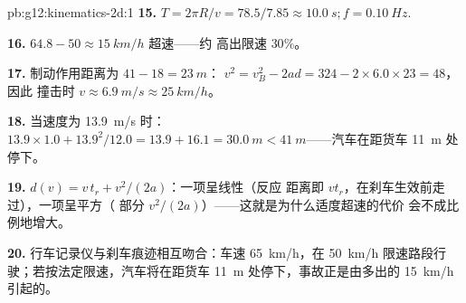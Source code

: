\begin{solution}{pb:g12:kinematics-2d:1}
\textbf{15.} $T = 2\pi R/v = 78.5/7.85 \approx \qty{10.0}{s};
f = \qty{0.10}{Hz}$.

\textbf{16.} $64.8 - 50 \approx \qty{15}{km/h}$ 超速——约
高出限速 $30\%$。

\textbf{17.} 制动作用距离为 $41 - 18 = \qty{23}{m}$：
$v^2 = v_B^2 - 2ad = 324 - 2 \times 6.0 \times 23 = 48$，因此
撞击时 $v \approx \qty{6.9}{m/s} \approx \qty{25}{km/h}$。

\textbf{18.} 当速度为 \qty{13.9}{m/s} 时：$13.9 \times 1.0 + 13.9^2/12.0 =
13.9 + 16.1 = \qty{30.0}{m} < \qty{41}{m}$——汽车在距货车
\qty{11}{m} 处停下。

\textbf{19.} $d(v) = v\,t_r + v^2/(2a)$：一项呈线性（反应
距离即 $v t_r$，在刹车生效前走过），一项呈平方（
部分 $v^2/(2a)$）——这就是为什么适度超速的代价
会不成比例地增大。

\textbf{20.} 行车记录仪与刹车痕迹相互吻合：车速 \qty{65}{km/h}，在
\qty{50}{km/h} 限速路段行驶；若按法定限速，汽车将在距货车
\qty{11}{m} 处停下，事故正是由多出的
\qty{15}{km/h} 引起的。
\end{solution}

